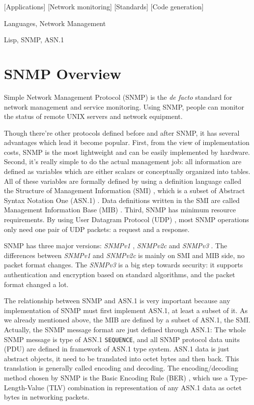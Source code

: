\documentclass[reprint,9pt]{sigplanconf}
\begin{document}
[Applications]
[Network monitoring]
[Standards]
[Code generation]

\terms
Languages, Network Management

\keywords
Lisp, SNMP, ASN.1

\section{SNMP Overview}

Simple Network Management Protocol (SNMP) is the \textit{de facto}
standard for network management and service monitoring. Using SNMP,
people can monitor the status of remote UNIX servers and network
equipment.

Though there're other protocols defined before and after
SNMP, it has several advantages which lead it become popular. First,
from the view of implementation costs, SNMP is the most lightweight and
can be easily implemented by hardware. Second, it's really simple to
do the actual management job: all information are defined as variables
which are either scalars or conceptually organized into tables. All of
these variables are formally defined by using a definition language
called the Structure of Management Information (SMI) \cite{RFC:2578},
which is a subset
of Abstract Syntax Notation One (ASN.1) \cite{ISO:ASN.1}.
Data definitions written
in the SMI are called Management Information Base (MIB) \cite{RFC:3418}.
Third, SNMP has minimum resource requirements.
By using User Datagram Protocol (UDP) \cite{RFC:768},
most SNMP operations only need one pair of UDP packets: a request and
a response.

SNMP has three major versions: \textsl{SNMPv1} \cite{RFC:1157},
\textsl{SNMPv2c} \cite{RFC:1901} and
\textsl{SNMPv3} \cite{RFC:3411}. The differences between \textsl{SNMPv1} and
\textsl{SNMPv2c} is mainly on SMI and MIB side, no packet format changes.
The \textsl{SNMPv3} is a big step towards security: it supports authentication
and encryption based on standard algorithms, and the packet format
changed a lot.

The relationship between SNMP and ASN.1 is very important because
any implementation of SNMP must first implement ASN.1, at least a subset of it.
As we already mentioned above, the MIB are defined by a subset of ASN.1,
the SMI. Actually, the SNMP message format are just defined through
ASN.1: The whole SNMP message is type of ASN.1 \texttt{SEQUENCE}, and
all SNMP protocol data units (PDU) are defined in framework of ASN.1 type
system. ASN.1 data is just abstract objects, it need to be translated
into octet bytes and then back. This translation is generally called encoding and
decoding.
The encoding/decoding method chosen by SNMP is the
Basic Encoding Rule (BER) \cite{ISO:BER},
which use a Type-Length-Value (TLV) combination in representation of any
ASN.1 data as octet bytes in networking packets.
\end{document}
